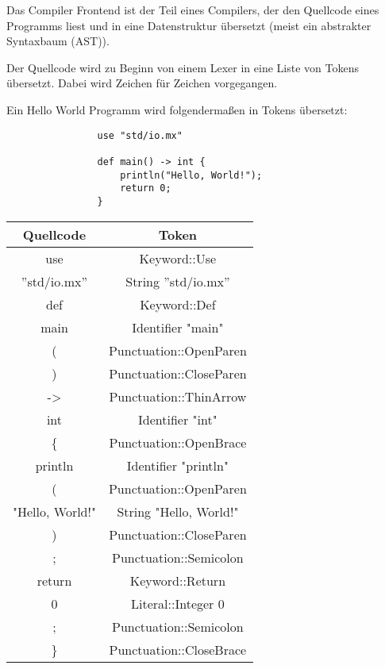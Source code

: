            Das Compiler Frontend ist der Teil eines Compilers, der den Quellcode eines Programms liest und in 
            eine Datenstruktur übersetzt (meist ein abstrakter Syntaxbaum (AST)). 

            Der Quellcode wird zu Beginn von einem Lexer in eine Liste von Tokens übersetzt.
            Dabei wird Zeichen für Zeichen vorgegangen.

            Ein Hello World Programm wird folgendermaßen in Tokens übersetzt:
            \newpage
            \begin{lstlisting}
                use "std/io.mx"

                def main() -> int {
                    println("Hello, World!");
                    return 0;
                }
            \end{lstlisting}

            \begin{center}
                \begin{tabular}{|c|c|}
                    \hline
                    Quellcode & Token \\
                    \hline
                    use & Keyword::Use \\
                    ''std/io.mx'' & String ''std/io.mx'' \\
                    def & Keyword::Def \\
                    main & Identifier "main" \\
                    ( & Punctuation::OpenParen \\
                    ) & Punctuation::CloseParen \\
                    -\textgreater & Punctuation::ThinArrow \\
                    int & Identifier "int" \\
                    \{ & Punctuation::OpenBrace \\
                    println & Identifier "println" \\
                    ( & Punctuation::OpenParen \\
                    "Hello, World!" & String "Hello, World!" \\
                    ) & Punctuation::CloseParen \\
                    ; & Punctuation::Semicolon \\
                    return & Keyword::Return \\
                    0 & Literal::Integer 0 \\
                    ; & Punctuation::Semicolon \\
                    \} & Punctuation::CloseBrace \\
                    \hline
 
                \end{tabular}
            \end{center}

